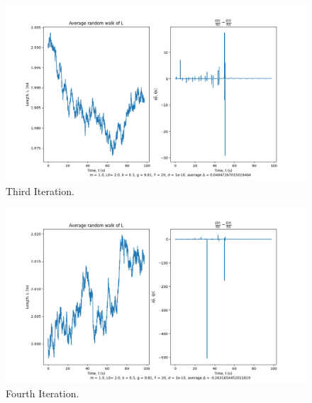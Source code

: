 \documentclass[10pt, twocolumn]{article}
\begin{document}
\begin{figure}[H]
    \centering
    \includegraphics[width = \columnwidth]{Projects/ForcedSimplePendulum/Plots/simplified m = 1.0, L0= 2.0, k = 0.5, g = 9.81, F = 20, sigma = 1e-10, run number 2.png}
    \caption{Third Iteration.}
    \label{fig:enter-label}
\end{figure}

\begin{figure}[H]
    \centering
    \includegraphics[width = \columnwidth]{Projects/ForcedSimplePendulum/Plots/simplified m = 1.0, L0= 2.0, k = 0.5, g = 9.81, F = 20, sigma = 1e-10, run number 3.png}
    \caption{Fourth Iteration.}
    \label{fig:enter-label}
\end{figure}
\end{document}
